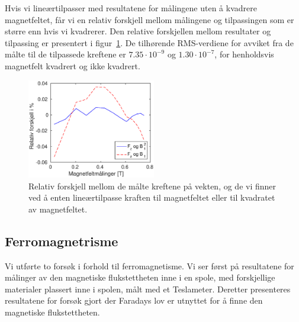 \documentclass[a4paper,11pt, twocolumn]{article}
\begin{document}
Hvis vi lineærtilpasser med resultatene for målingene uten å kvadrere magnetfeltet, får vi en relativ forskjell mellom målingene og tilpassingen som er større enn hvis vi kvadrerer. Den relative forskjellen mellom resultater og tilpassing er presentert i figur~\ref{fig:relativForskjell}. De tilhørende RMS-verdiene for avviket fra de målte til de tilpassede kreftene er $7.35\cdot 10^{-9}$ og $1.30\cdot 10^{-7}$, for henholdsvis magnetfelt kvadrert og ikke kvadrert.

\begin{figure}[!ht]
	\centering
	\includegraphics[width = 0.5\textwidth]{matlab/relativForskjell.eps}
	\caption{Relativ forskjell mellom de målte kreftene på vekten, og de vi finner ved å enten lineærtilpasse kraften til magnetfeltet eller til kvadratet av magnetfeltet.}
	\label{fig:relativForskjell}
\end{figure}
\subsection{Ferromagnetrisme}
Vi utførte to forsøk i forhold til ferromagnetisme. Vi ser først på resultatene for målinger av den magnetiske flukstettheten inne i en spole, med forskjellige materialer plassert inne i spolen, målt med et Teslameter. Deretter presenteres resultatene for forsøk gjort der Faradays lov er utnyttet for å finne den magnetiske flukstettheten.
\end{document}
